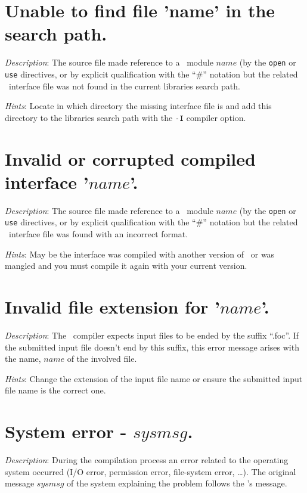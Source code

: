 \section*{Unable to find file 'name' in the search path.}

{\em Description}: The source file made reference to a \focal\ module
$name$ (by the {\tt open} or {\tt use} directives, or by explicit
qualification with the ``\#'' notation but the related
\focal\ interface file was not found in the current libraries search
path.

{\em Hints}: Locate in which directory the missing interface file is
and add this directory to the libraries search path with the {\tt -I}
compiler option.



\section*{Invalid or corrupted compiled interface '$name$'.}
{\em Description}: The source file made reference to a \focal\ module
$name$ (by the {\tt open} or {\tt use} directives, or by explicit
qualification with the ``\#'' notation but the related
\focal\ interface file was found with an incorrect format.

{\em Hints}: May be the interface was compiled with another version
of \focal\ or was mangled and you must compile it again with your
current version.



\section*{Invalid file extension for '$name$'.}
{\em Description}: The \focal\ compiler expects input files to be
ended by the suffix ``.foc''. If the submitted input file doesn't end
by this suffix, this error message arises with the name, $name$ of the
involved file.

{\em Hints}: Change the extension of the input file name or ensure the
submitted input file name is the correct one.



\section*{System error - $sysmsg$.}
{\em Description}: During the compilation process an error related to
the operating system occurred (I/O error, permission error, file-system
error, \ldots). The original message $sysmsg$ of the system explaining
the problem follows the \focal's message.

